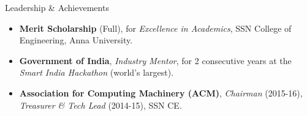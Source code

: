 \documentclass[]{mcdowellcv}
\begin{document}
	\begin{cvsection}{Leadership \& Achievements}
		\begin{cvsubsection}{}{}{}
			\begin{itemize}
				\item \textbf{Merit Scholarship} (Full), for \textit{Excellence in Academics}, SSN College of Engineering, Anna University.
                \item\textbf{Government of India}, \textit{Industry Mentor}, for 2 consecutive years at the \textit{Smart India Hackathon} (world's largest).
                \item \textbf{Association for Computing Machinery (ACM)}, \textit{Chairman} (2015-16), \textit{Treasurer \& Tech Lead} (2014-15), SSN CE.
			\end{itemize}
		\end{cvsubsection}
	\end{cvsection}
\end{document}
